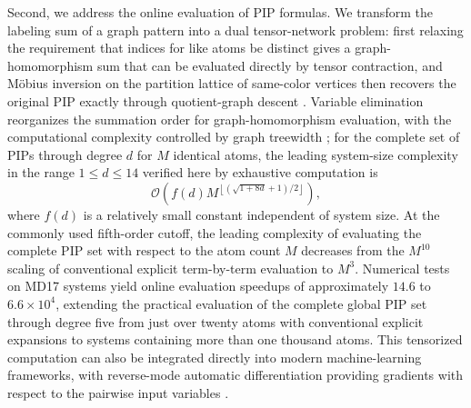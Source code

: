 Second, we address the online evaluation of PIP formulas.
We transform the labeling sum of a graph pattern into a dual tensor-network problem: first relaxing the requirement that indices for like atoms be distinct gives a graph-homomorphism sum that can be evaluated directly by tensor contraction, and M\"obius inversion on the partition lattice of same-color vertices then recovers the original PIP exactly through quotient-graph descent \cite{Lovasz2012GraphLimits,Curticapean2017Homomorphisms}.
Variable elimination reorganizes the summation order for graph-homomorphism evaluation, with the computational complexity controlled by graph treewidth \cite{Dechter1999BucketElimination,MarkovShi2008TensorNetworks}; for the complete set of PIPs through degree \(d\) for \(M\) identical atoms, the leading system-size complexity in the range \(1\le d\le14\) verified here by exhaustive computation is
\[
\mathcal O\!\left(f(d)M^{\left\lfloor(\sqrt{1+8d}+1)/2\right\rfloor}\right),
\]
where \(f(d)\) is a relatively small constant independent of system size.
At the commonly used fifth-order cutoff, the leading complexity of evaluating the complete PIP set with respect to the atom count \(M\) decreases from the \(M^{10}\) scaling of conventional explicit term-by-term evaluation to \(M^3\).
Numerical tests on MD17 systems yield online evaluation speedups of approximately \(14.6\) to \(6.6\times10^4\), extending the practical evaluation of the complete global PIP set through degree five from just over twenty atoms with conventional explicit expansions to systems containing more than one thousand atoms.
This tensorized computation can also be integrated directly into modern machine-learning frameworks, with reverse-mode automatic differentiation providing gradients with respect to the pairwise input variables \cite{Baydin2018AD}.


